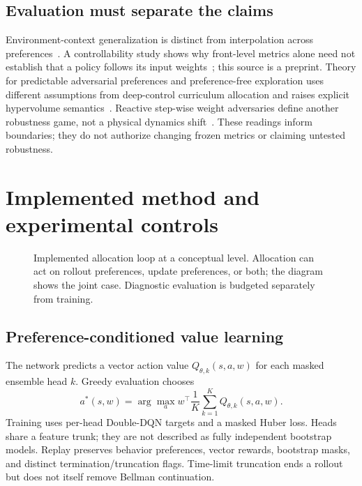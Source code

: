 \subsection{Evaluation must separate the claims}
Environment-context generalization is distinct from interpolation across
preferences~\cite{teoh2025morl-generalization}. A controllability study shows
why front-level metrics alone need not establish that a policy follows its
input weights~\cite{delasheras2026controllability}; this source is a preprint.
Theory for predictable adversarial preferences and preference-free exploration
uses different assumptions from deep-control curriculum allocation and raises
explicit hypervolume semantics~\cite{hu2026predictable-preferences}. Reactive
step-wise weight adversaries define another robustness game, not a physical
dynamics shift~\cite{hu2026reactive-preferences}. These readings inform boundaries;
they do not authorize changing frozen metrics or claiming untested robustness.

\section{Implemented method and experimental controls}

\begin{figure}[htbp]
\centering

\caption{Implemented allocation loop at a conceptual level. Allocation can act
on rollout preferences, update preferences, or both; the diagram shows the joint
case. Diagnostic evaluation is budgeted separately from training.}
\end{figure}

\subsection{Preference-conditioned value learning}
The network predicts a vector action value $Q_{\theta,k}(s,a,w)$ for each
masked ensemble head $k$. Greedy evaluation chooses
\[
 a^*(s,w)=\arg\max_a w^\top\frac{1}{K}\sum_{k=1}^{K}Q_{\theta,k}(s,a,w).
\]
Training uses per-head Double-DQN targets and a masked Huber loss. Heads
share a feature trunk; they are not described as fully independent bootstrap
models. Replay preserves behavior preferences, vector rewards, bootstrap masks,
and distinct termination/truncation flags. Time-limit truncation ends a rollout
but does not itself remove Bellman continuation.

